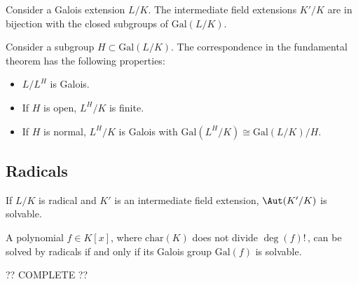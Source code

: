     \begin{theorem}
        Consider a Galois extension $L/K$. The intermediate field extensions $K'/K$ are in bijection with the closed subgroups of $\mathrm{Gal}(L/K)$.
    \end{theorem}
    \begin{property}
        Consider a subgroup $H\subset\mathrm{Gal}(L/K)$. The correspondence in the fundamental theorem has the following properties:
        \begin{itemize}
            \item $L/L^H$ is Galois.
            \item If $H$ is open, $L^H/K$ is finite.
            \item If $H$ is normal, $L^H/K$ is Galois with $\mathrm{Gal}\left(L^H/K\right)\cong\mathrm{Gal}(L/K)/H$.
        \end{itemize}
    \end{property}

\subsection{Radicals}


    \begin{property}
        If $L/K$ is radical and $K'$ is an intermediate field extension, $\Aut(K'/K)$ is solvable.
    \end{property}

    \begin{theorem}[Galois]
        A polynomial $f\in K[x]$, where $\mathrm{char}(K)$ does not divide $\deg(f)!$\,, can be solved by radicals if and only if its Galois group $\mathrm{Gal}(f)$ is solvable.
    \end{theorem}

    ?? COMPLETE ??